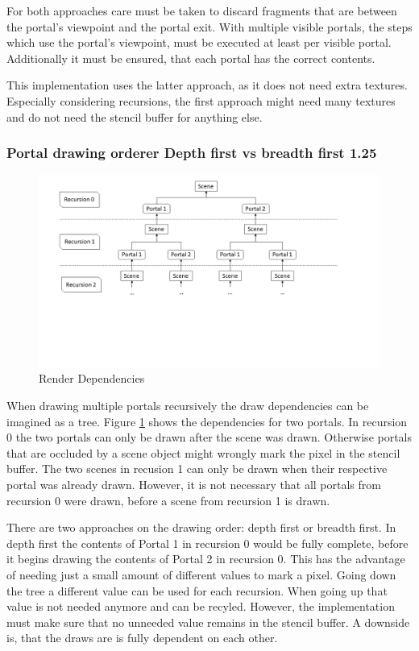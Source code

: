 For both approaches care must be taken to discard fragments that are between the portal's viewpoint and the portal exit. With multiple visible portals, the steps which use the portal's viewpoint, must be executed at least per visible portal. Additionally it must be ensured, that each portal has the correct contents.

This implementation uses the latter approach, as it does not need extra textures. Especially considering recursions, the first approach might need many textures and do not need the stencil buffer for anything else.

\subsubsection{Portal drawing orderer Depth first vs breadth first 1.25}

\begin{figure}[h]
	\includegraphics[width=\linewidth]{images/rendertree.png}
	\caption{Render Dependencies}
	\label{fig:rendertree}
\end{figure}


When drawing multiple portals recursively the draw dependencies can be imagined as a tree. Figure \ref{fig:rendertree} shows the dependencies for two portals. In recursion 0 the two portals can only be drawn after the scene was drawn. Otherwise portals that are occluded by a scene object might wrongly mark the pixel in the stencil buffer. The two scenes in recusion 1 can only be drawn when their respective portal was already drawn. However, it is not necessary that all portals from recursion 0 were drawn, before a scene from recursion 1 is drawn.

There are two approaches on the drawing order: depth first or breadth first. In depth first the contents of Portal 1 in recursion 0 would be fully complete, before it begins drawing the contents of Portal 2 in recursion 0. This has the advantage of needing just a small amount of different values to mark a pixel. Going down the tree a different value can be used for each recursion. When going up that value is not needed anymore and can be recyled. However, the implementation must make sure that no unneeded value remains in the stencil buffer. A downside is, that the draws are is fully dependent on each other.

